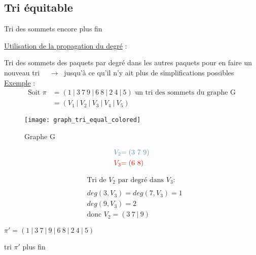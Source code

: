 \subsection{Tri équitable}
\begin{frame}{Tri des sommets encore plus fin}
    \begin{center}
        \underline{Utilisation de la propagation du degré} :
    \end{center}
    Tri des sommets des paquets par degré dans les autres paquets pour en faire un nouveau tri \newline
    $\quad \rightarrow \ $ jusqu'à ce qu'il n'y ait plus de simplifications possibles \newline \newline
    \underline{Exemple} :
    \begin{align*}
        \text{Soit } \pi &= (1\ |\ 3\ 7\ 9\ |\ 6\ 8\ |\ 2\ 4\ |\ 5) \text{ un tri des sommets du graphe G} \\
        &= (V_1\ |\ V_2\ |\ V_3 \ | \ V_4\ |\ V_5)
    \end{align*} 
    \begin{minipage}{0.3\textwidth}
        \begin{figure}
        \texttt{[image: graph\_tri\_equal\_colored]} 
        \caption{\label{fig:graphe_tri_equal}Graphe G}
        \end{figure}
    \end{minipage}
    \begin{minipage}{0.25\textwidth}
        \begin{align*}
            \textcolor{airforceblue}{V_2} & \textcolor{airforceblue}{=(3 \ 7\ 9)} \\
            \textcolor{red}{V_3}  & \textcolor{red}{=(6\ 8)}
        \end{align*}
    \end{minipage} 
    \begin{minipage}{0.4\textwidth}
        \begin{align*}
        & \text{Tri de } V_2 \text{ par degré dans } V_3 : \\ \\
        & deg(3,V_3)=deg(7,V_3)=1 \\
        & deg(9,V_3)=2 \\
        & \text{donc } V_2 = (3\ 7\ |\ 9)
        \end{align*}
        \begin{center}
            $\pi ' = (1\ |\ 3\ 7\ |\ 9\ |\ 6\ 8\ |\ 2\ 4\ |\ 5)$
        \end{center}
    \end{minipage}
    \begin{center}
    tri $\pi'$ plus fin
    \end{center}
\end{frame}

